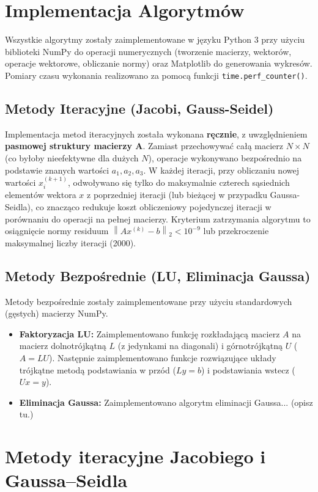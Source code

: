 \documentclass[a4paper, 11pt]{article}
\newcommand{\norm}[1]{\left\lVert#1\right\rVert}
\begin{document}
\section{Implementacja Algorytmów}
Wszystkie algorytmy zostały zaimplementowane w języku Python 3 przy użyciu biblioteki NumPy do operacji numerycznych (tworzenie macierzy, wektorów, operacje wektorowe, obliczanie normy) oraz Matplotlib do generowania wykresów. Pomiary czasu wykonania realizowano za pomocą funkcji \texttt{time.perf\_counter()}.

\subsection{Metody Iteracyjne (Jacobi, Gauss-Seidel)}
Implementacja metod iteracyjnych została wykonana \textbf{ręcznie}, z uwzględnieniem \textbf{pasmowej struktury macierzy A}. Zamiast przechowywać całą macierz $N \times N$ (co byłoby nieefektywne dla dużych $N$), operacje wykonywano bezpośrednio na podstawie znanych wartości $a_1, a_2, a_3$. W każdej iteracji, przy obliczaniu nowej wartości $x_i^{(k+1)}$, odwoływano się tylko do maksymalnie czterech sąsiednich elementów wektora $x$ z poprzedniej iteracji (lub bieżącej w przypadku Gaussa-Seidla), co znacząco redukuje koszt obliczeniowy pojedynczej iteracji w porównaniu do operacji na pełnej macierzy. Kryterium zatrzymania algorytmu to osiągnięcie normy residuum $\norm{Ax^{(k)} - b}_2 < 10^{-9}$ lub przekroczenie maksymalnej liczby iteracji (2000).

\subsection{Metody Bezpośrednie (LU, Eliminacja Gaussa)}
Metody bezpośrednie zostały zaimplementowane przy użyciu standardowych (gęstych) macierzy NumPy.
\begin{itemize}
    \item \textbf{Faktoryzacja LU:} Zaimplementowano funkcję rozkładającą macierz $A$ na macierz dolnotrójkątną $L$ (z jedynkami na diagonali) i górnotrójkątną $U$ ($A = LU$). Następnie zaimplementowano funkcje rozwiązujące układy trójkątne metodą podstawiania w przód ($Ly=b$) i podstawiania wstecz ($Ux=y$).
    \item \textbf{Eliminacja Gaussa:} Zaimplementowano algorytm eliminacji Gaussa... (opisz tu.)
\end{itemize}

\section{Metody iteracyjne Jacobiego i Gaussa–Seidla}
\end{document}
